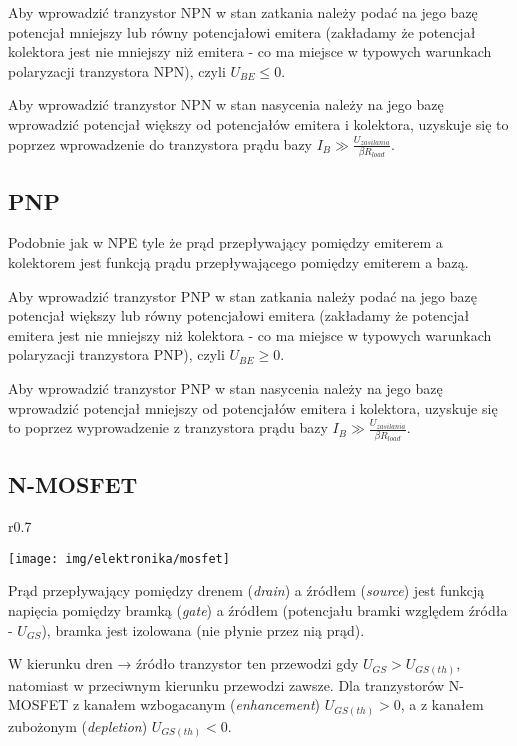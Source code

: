 \documentclass{pdfBooklets}
\begin{document}
Aby wprowadzić tranzystor NPN w stan zatkania należy podać na jego bazę potencjał mniejszy lub równy potencjałowi emitera (zakładamy że potencjał kolektora jest nie mniejszy niż emitera - co ma miejsce w typowych warunkach polaryzacji tranzystora NPN), czyli $U_{BE} \leq 0$.

Aby wprowadzić tranzystor NPN w stan nasycenia należy na jego bazę wprowadzić potencjał większy od potencjałów emitera i kolektora, uzyskuje się to poprzez wprowadzenie do tranzystora prądu bazy $I_B \gg \frac{U_{zasilania}}{\beta R_{load}}$.

\subsection{PNP}
Podobnie jak w NPE tyle że prąd przepływający pomiędzy emiterem a kolektorem jest funkcją prądu przepływającego pomiędzy emiterem a bazą.

Aby wprowadzić tranzystor PNP w stan zatkania należy podać na jego bazę potencjał większy lub równy potencjałowi emitera (zakładamy że potencjał emitera jest nie mniejszy niż kolektora - co ma miejsce w typowych warunkach polaryzacji tranzystora PNP), czyli $U_{BE} \geq 0$.

Aby wprowadzić tranzystor PNP w stan nasycenia należy na jego bazę wprowadzić potencjał mniejszy od potencjałów emitera i kolektora, uzyskuje się to poprzez wyprowadzenie z tranzystora prądu bazy $I_B \gg \frac{U_{zasilania}}{\beta R_{load}}$.

\subsection{N-MOSFET}

\begin{wrapfigure}{r}{0.7\textwidth}
  \begin{center}
    \vspace{-40pt}
    \texttt{[image: img/elektronika/mosfet]}
    \vspace{-20pt}
  \end{center}
\end{wrapfigure}

Prąd przepływający pomiędzy drenem (\emph{drain}) a źródłem (\emph{source}) jest funkcją napięcia pomiędzy bramką (\emph{gate}) a źródłem (potencjału bramki względem źródła - $U_{GS}$), bramka jest izolowana (nie płynie przez nią prąd).

W kierunku dren → źródło tranzystor ten przewodzi gdy $U_{GS} > U_{GS (th)}$, natomiast w przeciwnym kierunku przewodzi zawsze. Dla tranzystorów N-MOSFET z kanałem wzbogacanym (\emph{enhancement}) $U_{GS (th)} > 0$, a z kanałem zubożonym (\emph{depletion}) $U_{GS (th)} < 0$.
\end{document}
